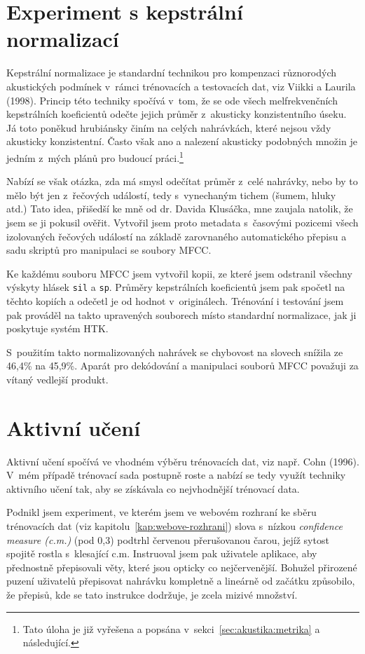 \section{Experiment s kepstrální normalizací}
\label{sec:mfcc-norm}

Kepstrální normalizace je standardní technikou pro kompenzaci různorodých
akustických podmínek v~rámci trénovacích a testovacích dat, viz Viikki a Laurila
(1998)\cite{viikki1998cepstral}. Princip této techniky spočívá v~tom, že se ode
všech melfrekvenčních kepstrálních koeficientů odečte jejich průměr z~akusticky
konzistentního úseku. Já toto poněkud hrubiánsky činím na celých nahrávkách,
které nejsou vždy akusticky konzistentní. Často však ano a nalezení akusticky
podobných množin je jedním z~mých plánů pro budoucí práci.\footnote{Tato úloha
je již vyřešena a popsána v~sekci~\ref{sec:akustika:metrika} a následující.}

Nabízí se však otázka, zda má smysl odečítat průměr z~celé nahrávky, nebo by to
mělo být jen z~řečových událostí, tedy s~vynechaným tichem (šumem, hluky atd.)
Tato idea, přišedší ke mně od dr. Davida Klusáčka, mne zaujala natolik, že jsem se
ji pokusil ověřit. Vytvořil jsem proto metadata s~časovými pozicemi všech
izolovaných řečových událostí na základě zarovnaného automatického přepisu a sadu skriptů
pro manipulaci se soubory MFCC.

Ke každému souboru MFCC jsem vytvořil kopii, ze které
jsem odstranil všechny výskyty hlásek \texttt{sil} a \texttt{sp}. Průměry kepstrálních
koeficientů jsem pak spočetl na těchto kopiích a odečetl je od hodnot
v~originálech. Trénování i testování jsem pak prováděl na takto upravených
souborech místo standardní normalizace, jak ji poskytuje systém HTK.

S~použitím takto normalizovaných nahrávek se chybovost na slovech snížila ze
46,4\% na 45,9\%.  Aparát pro dekódování
a manipulaci souborů MFCC považuji za vítaný vedlejší produkt.

\section{Aktivní učení}

Aktivní učení spočívá ve vhodném výběru trénovacích dat, viz např. Cohn
(1996)\cite{cohn1996active}. V~mém případě trénovací sada postupně roste a nabízí
se tedy využít techniky aktivního učení tak, aby se získávala co nejvhodnější
trénovací data.

Podnikl jsem experiment, ve kterém jsem ve webovém rozhraní ke sběru trénovacích
dat (viz kapitolu~\ref{kap:webove-rozhrani}) slova s~nízkou {\em confidence
measure (c.m.)} (pod 0,3) podtrhl červenou přerušovanou čarou, jejíž sytost spojitě rostla
s~klesající c.m. Instruoval jsem pak uživatele aplikace, aby přednostně
přepisovali věty, které jsou opticky co nejčervenější. Bohužel přirozené puzení
uživatelů přepisovat nahrávku kompletně a lineárně od začátku způsobilo, že
přepisů, kde se tato instrukce dodržuje, je zcela mizivé množství.

